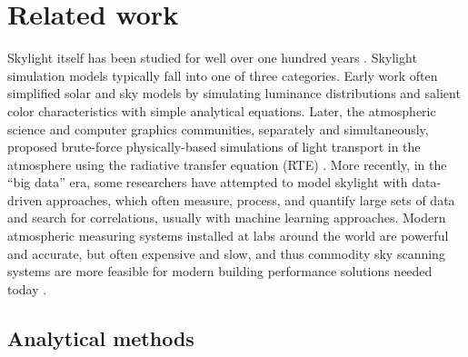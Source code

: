 \section{Related work}
\label{sec:background}

\begin{table}%
\begin{framed}
\printnomenclature
\end{framed}
\end{table}

Skylight itself has been studied for well over one hundred years \citep{strutt_lightfromsky_1871, mie_beitrage_1908}. Skylight simulation models typically fall into one of three categories. Early work often simplified solar and sky models by simulating luminance distributions and salient color characteristics with simple analytical equations. Later, the atmospheric science and computer graphics communities, separately and simultaneously, proposed brute-force physically-based simulations of light transport in the atmosphere using the radiative transfer equation (RTE) \citep{chandrasekhar_1950, mishchenko_2002, chandrasekhar_radiative}. More recently, in the ``big data'' era, some researchers have attempted to model skylight with data-driven approaches, which often measure, process, and quantify large sets of data and search for correlations, usually with machine learning approaches. Modern atmospheric measuring systems installed at labs around the world are powerful and accurate, but often expensive and slow, and thus commodity sky scanning systems are more feasible for modern building performance solutions needed today \citep{butler_2008, mazria_2008}.

\subsection{Analytical methods}

